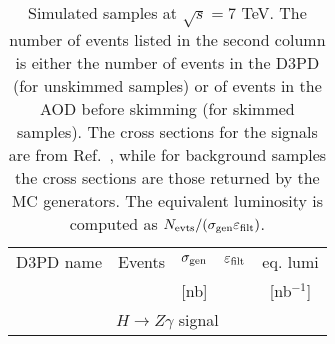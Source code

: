 \begin{sidewaystable}[!htbp]
  \begin{center}
    \caption{Simulated samples at $\sqrt{s}=7$ TeV. The number of events listed in the
      second column is either the number of events in the D3PD (for unskimmed samples)
      or of events in the AOD before skimming (for skimmed samples).
      The cross sections for the signals are from Ref.~\cite{LHCHiggsCrossSectionWorkingGroup:2011ti}, 
    while for background samples the cross sections are those returned by the MC generators.
      The equivalent luminosity is computed as $N_{\rm evts}/(\sigma_{\rm gen}\varepsilon_{\rm filt})$.}
    \label{tab:MCsamples_7TeV}
    \tiny
       \begin{tabular}{ccccc}
         \hline
         \hline
         D3PD name &           Events  &    $\sigma_{\rm gen}$ & $\varepsilon_{\rm filt}$ & eq. lumi \\
                   &                   &    [nb]              &                        &  [nb$^{-1}$]   \\
         \hline
         \multicolumn{5}{c}{$H\to Z\gamma$ signal} \\
         \hline

\end{tabular}
\end{center}
\end{sidewaystable}
